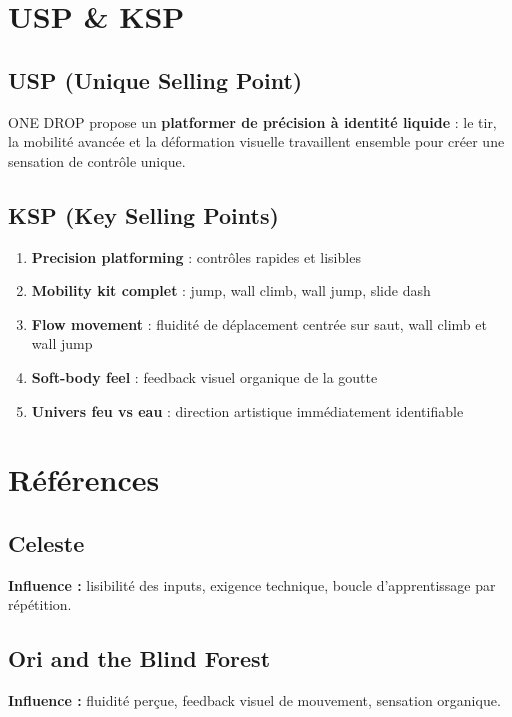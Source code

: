 ﻿\documentclass[12pt,a4paper]{article}
\begin{document}
\section{USP \& KSP}

\subsection{USP (Unique Selling Point)}

ONE DROP propose un \textbf{platformer de précision à identité liquide} : le tir, la mobilité avancée et la déformation visuelle travaillent ensemble pour créer une sensation de contrôle unique.

\subsection{KSP (Key Selling Points)}

\begin{enumerate}
    \item \textbf{Precision platforming} : contrôles rapides et lisibles
    \item \textbf{Mobility kit complet} : jump, wall climb, wall jump, slide dash
    \item \textbf{Flow movement} : fluidité de déplacement centrée sur saut, wall climb et wall jump
    \item \textbf{Soft-body feel} : feedback visuel organique de la goutte
    \item \textbf{Univers feu vs eau} : direction artistique immédiatement identifiable
\end{enumerate}

\section{Références}

\subsection{Celeste}
\textbf{Influence :} lisibilité des inputs, exigence technique, boucle d'apprentissage par répétition.

\subsection{Ori and the Blind Forest}
\textbf{Influence :} fluidité perçue, feedback visuel de mouvement, sensation organique.
\end{document}

